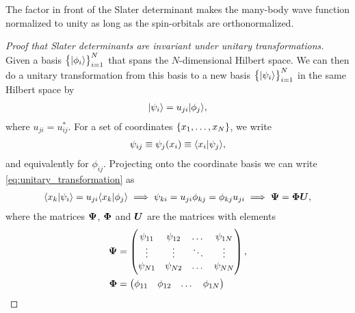         The factor in front of the Slater determinant makes the many-body wave
        function normalized to unity as long as the spin-orbitals are
        orthonormalized.

        \begin{proof}[Proof that Slater determinants are invariant under unitary
            transformations]
            \label{proof:slater_determinants_invariant}
            Given a basis $\left\{ | \phi_i \rangle \right\}_{i = 1}^{N}$ that spans the
            $N$-dimensional Hilbert space. We can then do a unitary
            transformation from this basis to a new basis
            $\left\{ | \psi_i \rangle \right\}_{i = 1}^{N}$ in the same Hilbert space by
            \begin{align}
                | \psi_i \rangle = u_{ji}| \phi_j \rangle,
                \label{eq:unitary_transformation}
            \end{align}
            where $u_{ji} = u_{ij}^{*}$. For a set of coordinates
            $\left\{ x_1, \dots, x_N \right\}$, we write
            \begin{align}
                \psi_{ij} \equiv \psi_j(x_i)
                \equiv \langle x_i | \psi_j \rangle,
            \end{align}
            and equivalently for $\phi_{ij}$. Projecting onto the coordinate
            basis we can write \autoref{eq:unitary_transformation} as
            \begin{gather}
                \langle x_k | \psi_i \rangle
                = u_{ji}\langle x_k | \phi_j \rangle
                \implies
                \psi_{ki} = u_{ji}\phi_{kj} = \phi_{kj}u_{ji}
                \implies \boldsymbol{\Psi} = \boldsymbol{\Phi}\boldsymbol{U},
            \end{gather}
            where the matrices $\boldsymbol{\Psi}$, $\boldsymbol{\Phi}$ and $\boldsymbol{U}$ are
            the matrices with elements
            \begin{align}
                \boldsymbol{\Psi}
                &= \begin{pmatrix}
                    \psi_{11} & \psi_{12} & \dots & \psi_{1N} \\
                    \vdots & \vdots & \ddots & \vdots \\
                    \psi_{N1} & \psi_{N2} & \dots & \psi_{NN}
                \end{pmatrix}, \\
                \boldsymbol{\Phi}
                &= \begin{pmatrix}
                    \phi_{11} & \phi_{12} & \dots & \phi_{1N} \\

\end{pmatrix}
\end{align}
\end{proof}
